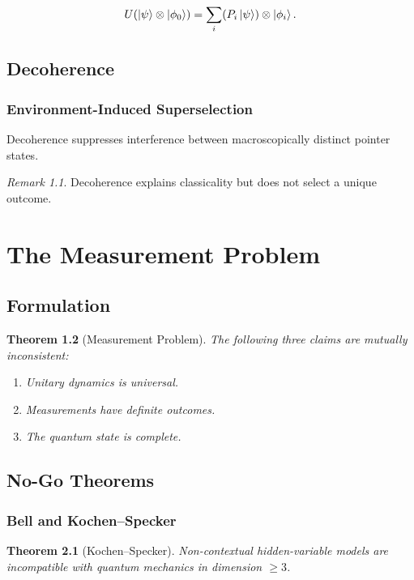 \documentclass[12pt]{book}
\theoremstyle{plain}
\newtheorem{theorem}{Theorem}[chapter]
\theoremstyle{definition}
\theoremstyle{remark}
\newtheorem{remark}[theorem]{Remark}
\begin{document}
\begin{equation}
U(\ket{\psi}\otimes\ket{\phi_0}) = \sum_i (P_i \ket{\psi}) \otimes \ket{\phi_i}.
\end{equation}

\chapter{Decoherence}

\section{Environment-Induced Superselection}
Decoherence suppresses interference between macroscopically distinct pointer states.

\begin{remark}
Decoherence explains classicality but does not select a unique outcome.
\end{remark}

\part{The Measurement Problem}

\chapter{Formulation}

\begin{theorem}[Measurement Problem]
The following three claims are mutually inconsistent:
\begin{enumerate}[label=(\roman*)]
\item Unitary dynamics is universal.
\item Measurements have definite outcomes.
\item The quantum state is complete.
\end{enumerate}
\end{theorem}

\chapter{No-Go Theorems}

\section{Bell and Kochen--Specker}

\begin{theorem}[Kochen--Specker]
Non-contextual hidden-variable models are incompatible with quantum mechanics in dimension $\ge 3$.
\end{theorem}
\end{document}

